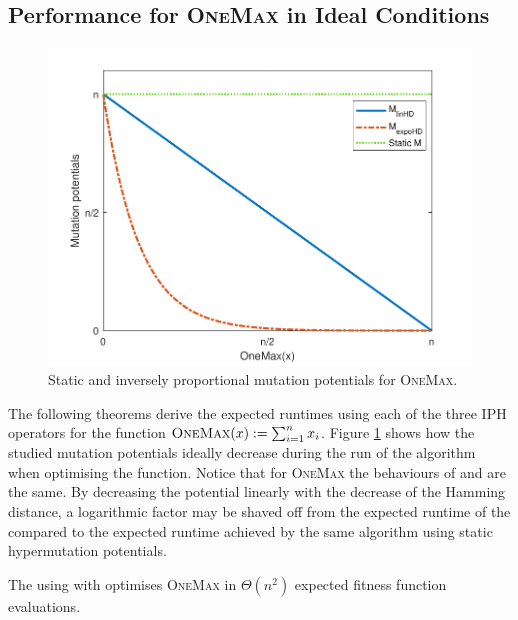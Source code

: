 \documentclass[lettersize,journal]{IEEEtran}
\begin{document}
\subsection{Performance for \textsc{OneMax} in Ideal Conditions}
\begin{figure}[t!]
\centering
\includegraphics[width=\columnwidth]{a}
\caption{Static and inversely proportional mutation potentials for \textsc{OneMax}.}
\label{fig:onemax}
\end{figure}

The following theorems derive the expected runtimes using each of the three IPH operators for the function $\textsc{OneMax}(x):=\sum_{i=1}^{n}x_i$. 
Figure \ref{fig:onemax} %
shows how the studied mutation potentials ideally decrease during the run of the algorithm when optimising the function. 
Notice that for \textsc{OneMax} the behaviours of   {\expoF } and {\expoHD }  are the same. %
By decreasing the potential linearly with the decrease of the Hamming distance, a logarithmic factor may be shaved off from the expected runtime of the {\oneoneIA } compared to the expected runtime achieved by the same algorithm using static hypermutation potentials.



\begin{theorem} \label{th:linHD-OM}
The {\oneoneIA } using \IPHfcm{} with {\linHD } optimises \textsc{OneMax} in $\Theta(n^2)$ expected fitness function evaluations.
\end{theorem}
\end{document}
